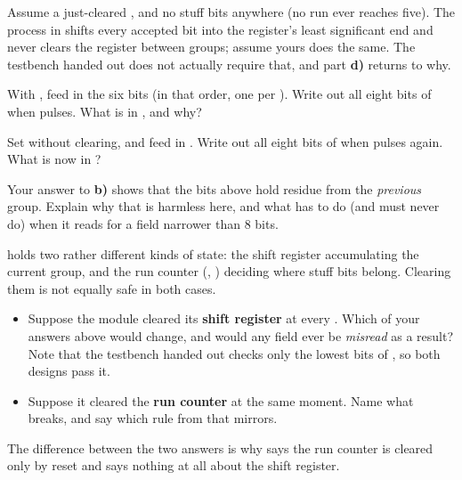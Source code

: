 Assume a just-cleared ,  and no stuff bits anywhere (no run ever
reaches five). The process in  shifts every accepted bit into the register's
least significant end and never clears the register between groups; assume yours does the same. The
testbench handed out does not actually require that, and part \textbf{d)} returns to why.

 With , feed in the six bits  (in that order, one per
). Write out all eight bits of  when  pulses. What is in
, and why?

 Set  without clearing, and feed in . Write out all eight
bits of  when  pulses again. What is now in ?

 Your answer to \textbf{b)} shows that the bits above  hold residue from the
\emph{previous} group. Explain why that is harmless here, and what  has to do
(and must never do) when it reads  for a field narrower than 8 bits.

  holds two rather different kinds of state: the shift register
accumulating the current group, and the run counter (, ) deciding
where stuff bits belong. Clearing them is not equally safe in both cases.
\begin{itemize}
  \item Suppose the module cleared its \textbf{shift register} at every . Which of your
    answers above would change, and would any field ever be \emph{misread} as a result? Note that the
    testbench handed out checks only the lowest  bits of , so both designs
    pass it.
  \item Suppose it cleared the \textbf{run counter} at the same moment. Name what breaks, and say
    which rule from  that mirrors.
\end{itemize}

The difference between the two answers is why  says the run counter is
cleared only by reset and says nothing at all about the shift register.
